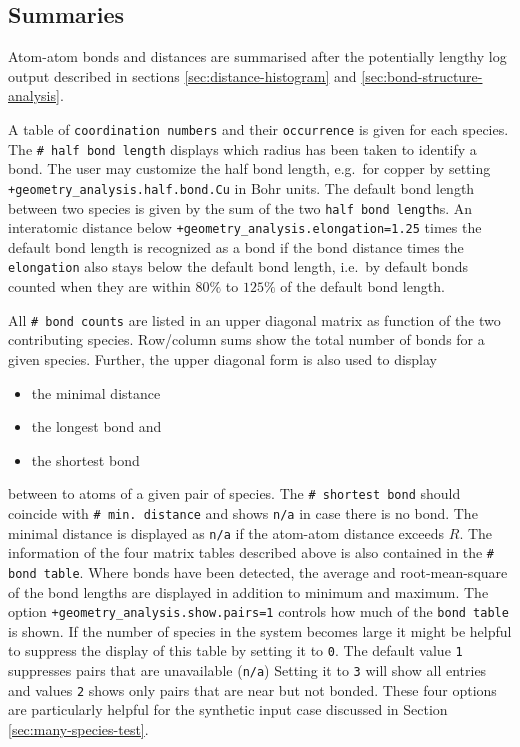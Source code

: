 \documentclass[oribibl]{llncs}
\newcommand{\ttt}[1]{\texttt{#1}}
\begin{document}
\subsection{Summaries}
%
Atom-atom bonds and distances are summarised after the potentially lengthy log output described in
sections \ref{sec:distance-histogram} and \ref{sec:bond-structure-analysis}.

\noindent
A table of \ttt{coordination numbers} and their \ttt{occurrence} is given for each species.
The \ttt{\# half bond length} displays which radius has been taken to identify a bond.
The user may customize the half bond length, e.g.~for copper 
by setting \ttt{+geometry\_analysis.half.bond.Cu} in Bohr units.
The default bond length between two species is given by the sum of
the two \ttt{half bond length}s.
An interatomic distance below \ttt{+geometry\_analysis.elongation=1.25} 
times the default bond length is recognized as a bond
if the bond distance times the \ttt{elongation} also stays below the default bond length,
i.e.~by default bonds counted when they are within $80\%$ to $125\%$ of the default bond length.
%

\noindent
All \ttt{\# bond counts} are listed in an upper diagonal matrix as function of the two
contributing species. Row/column sums show the total number of bonds for a given species.
Further, the upper diagonal form is also used to display
\begin{itemize}
	\item the minimal distance
	\item the longest bond and
	\item the shortest bond
\end{itemize}
between to atoms of a given pair of species.
The \ttt{\# shortest bond} should coincide with \ttt{\# min. distance}
and shows \ttt{n/a} in case there is no bond.
The minimal distance is displayed as \ttt{n/a} if the atom-atom distance exceeds $R$.
%
The information of the four matrix tables described above
is also contained in the \ttt{\# bond table}.
Where bonds have been detected, 
the average and root-mean-square of the bond lengths are displayed
in addition to minimum and maximum.
The option \ttt{+geometry\_analysis.show.pairs=1} controls how much of the \ttt{bond table} is shown.
If the number of species in the system becomes large it might be helpful
to suppress the display of this table by setting it to \ttt{0}.
The default value \ttt{1} suppresses pairs that are unavailable (\ttt{n/a})
Setting it to \ttt{3} will show all entries and values \ttt{2} shows only
pairs that are near but not bonded.
These four options are particularly helpful for the synthetic input case discussed in Section \ref{sec:many-species-test}.
\end{document}
